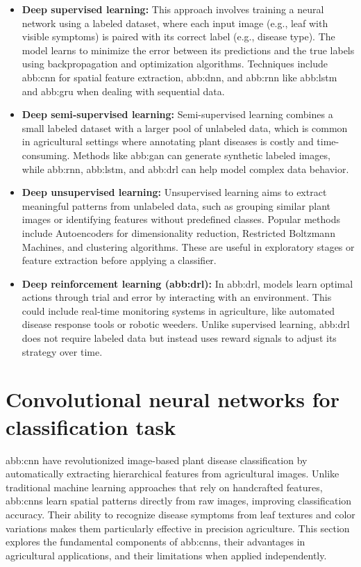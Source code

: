 \begin{itemize}
    \item \textbf{Deep supervised learning:} This approach involves training a neural network using a labeled dataset, where each input image (e.g., leaf with visible symptoms) is paired with its correct label (e.g., disease type). The model learns to minimize the error between its predictions and the true labels using backpropagation and optimization algorithms. Techniques include \gls{abb:cnn} for spatial feature extraction, \gls{abb:dnn}, and \gls{abb:rnn} like \gls{abb:lstm} and \gls{abb:gru} when dealing with sequential data.
    
    \item \textbf{Deep semi‐supervised learning:} Semi-supervised learning combines a small labeled dataset with a larger pool of unlabeled data, which is common in agricultural settings where annotating plant diseases is costly and time-consuming. Methods like \gls{abb:gan} can generate synthetic labeled images, while \gls{abb:rnn}, \gls{abb:lstm}, and \gls{abb:drl} can help model complex data behavior.
    
    \item \textbf{Deep unsupervised learning:} Unsupervised learning aims to extract meaningful patterns from unlabeled data, such as grouping similar plant images or identifying features without predefined classes. Popular methods include Autoencoders for dimensionality reduction, Restricted Boltzmann Machines, and clustering algorithms. These are useful in exploratory stages or feature extraction before applying a classifier.
    
    \item \textbf{Deep reinforcement learning (\gls{abb:drl}):} In \gls{abb:drl}, models learn optimal actions through trial and error by interacting with an environment. This could include real-time monitoring systems in agriculture, like automated disease response tools or robotic weeders. Unlike supervised learning, \gls{abb:drl} does not require labeled data but instead uses reward signals to adjust its strategy over time.
\end{itemize}

\section{Convolutional neural networks for classification task}

\gls{abb:cnn} have revolutionized image-based plant disease classification by automatically extracting hierarchical features from agricultural images. Unlike traditional machine learning approaches that rely on handcrafted features, \gls{abb:cnn}s learn spatial patterns directly from raw images, improving classification accuracy. Their ability to recognize disease symptoms from leaf textures and color variations makes them particularly effective in precision agriculture. This section explores the fundamental components of \gls{abb:cnn}s, their advantages in agricultural applications, and their limitations when applied independently.

